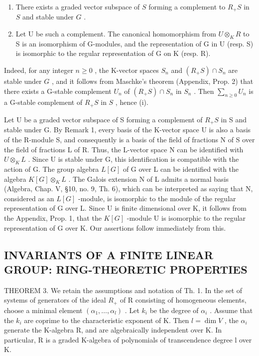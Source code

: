 \begin{enumerate}
\def\labelenumi{(\roman{enumi})}
\item
  There exists a graded vector subspace of \(S\) forming a complement to \(R_{+}S\) in \(S\) and stable under \(G\) .
\item
  Let U be such a complement. The canonical homomorphism from \(U \otimes_{K} R\) to S is an isomorphism of G-modules, and the representation of G in U (resp. S) is isomorphic to the regular representation of G on K (resp. R).
\end{enumerate}

Indeed, for any integer \(n \geqslant 0\) , the K-vector spaces \(S_n\) and \((R_+S) \cap S_n\) are stable under \(G\) , and it follows from Maschke's theorem (Appendix, Prop. 2) that there exists a G-stable complement \(U_n\) of \((R_+S) \cap S_n\) in \(S_n\) . Then \(\sum_{n \geqslant 0} U_n\) is a G-stable complement of \(R_+S\) in \(S\) , hence (i).

Let U be a graded vector subspace of S forming a complement of \(R_{+}S\) in S and stable under G. By Remark 1, every basis of the K-vector space U is also a basis of the R-module S, and consequently is a basis of the field of fractions N of S over the field of fractions L of R. Thus, the L-vector space N can be identified with \(U \otimes_{K} L\) . Since U is stable under G, this identification is compatible with the action of G. The group algebra \(L[G]\) of G over L can be identified with the algebra \(K[G] \otimes_{K} L\) . The Galois extension N of L admits a normal basis (Algebra, Chap. V, §10, no. 9, Th. 6), which can be interpreted as saying that N, considered as an \(L[G]\) -module, is isomorphic to the module of the regular representation of G over L. Since U is finite dimensional over K, it follows from the Appendix, Prop. 1, that the \(K[G]\) -module U is isomorphic to the regular representation of G over K. Our assertions follow immediately from this.

\subsection{INVARIANTS OF A FINITE LINEAR GROUP: RING-THEORETIC PROPERTIES}

THEOREM 3. We retain the assumptions and notation of Th. 1. In the set of systems of generators of the ideal \(R_{+}\) of R consisting of homogeneous elements, choose a minimal element \((\alpha_{1},\ldots,\alpha_{l})\) . Let \(k_{i}\) be the degree of \(\alpha_{i}\) . Assume that the \(k_{i}\) are coprime to the characteristic exponent of K. Then \(l=\dim V\) , the \(\alpha_{i}\) generate the K-algebra R, and are algebraically independent over K. In particular, R is a graded K-algebra of polynomials of transcendence degree l over K.

